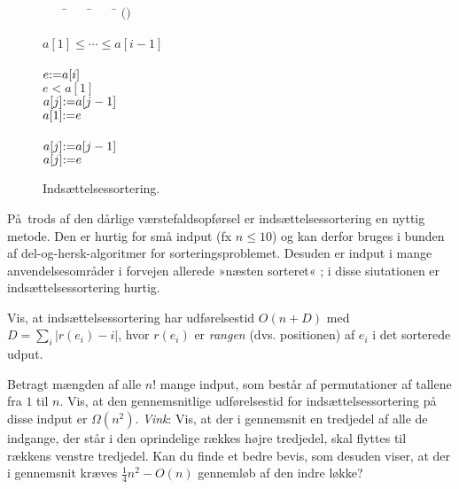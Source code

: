 \begin{figure}
\begin{tabbing}
~~~~\=~~~~\=~~~~\=\kill
  \Procedure {}$($$)$\+\\
  \+\\
    \Invariant $a[1]\leq\cdots\leq a[i-1]$\\
    \\
    $e {\mathbin{:=}} a[i]$\\
    \If $e<a[1]$ \Then\+\\
       $a[j] {\ensuremath{\mathbin{:=}}} a[j-1]$\\
      $a[1] {\ensuremath{\mathbin{:=}}} e$ \- \\ 
    \Else\+\\ 
       $a[j] {\ensuremath{\mathbin{:=}}} a[j-1]$\\
      $a[j] {\ensuremath{\mathbin{:=}}} e$
\end{tabbing}
\caption{Indsættelsessortering.}
\end{figure}

På trods af den dårlige værstefaldsopførsel er indsættelsessortering en nyttig metode.
Den er hurtig for små indput
(fx $n\le 10$) og kan derfor bruges i bunden af del-og-hersk-algoritmer for sorteringsproblemet.
Desuden er indput i mange anvendelsesområder i forvejen allerede 
»næsten sorteret« 
;
i disse siutationen er indsættelsessortering hurtig.

\begin{exerc}
  Vis, at indsættelsessortering har udførelsestid $O(n + D)$ med
 $D= \sum_i \left|r(e_i)-i\right|$, hvor
  $r(e_i)$ er \emph{rangen} (dvs. positionen) af $e_i$ i det sorterede udput.
\end{exerc}

\begin{exerc}[Gennemsnitsanalyse]%
  Betragt mængden af alle $n!$ mange indput, som består af permutationer af tallene fra 
  $1$ til $n$.
  Vis, at den gennemsnitlige udførelsestid for indsættelsessortering på disse indput er 
  $\Omega(n^2)$.
  \emph{Vink}:
  Vis, at der i gennemsnit en tredjedel af alle de indgange, der står i den oprindelige rækkes højre tredjedel, skal flyttes til rækkens venstre tredjedel.
  Kan du finde et bedre bevis, som desuden viser, at der i gennemsnit kræves
  $\frac{1}{4}n^2-O(n)$ gennemløb af den indre løkke?
\end{exerc}


